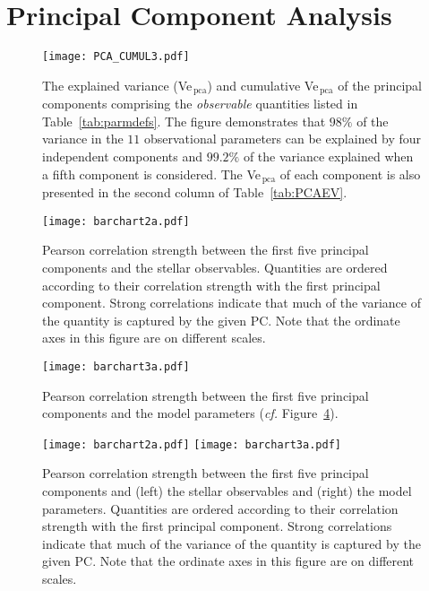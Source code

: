 \section{Principal Component Analysis}
\label{sec:PCA}
\begin{figure}
    \centering
    \texttt{[image: PCA\_CUMUL3.pdf]}
    \caption[Explained variance of principal components]{{The explained variance (Ve$_{\,\text{pca}}$) and cumulative Ve$_{\,\text{pca}}$ of the principal components comprising the \emph{observable} quantities listed in Table~\ref{tab:parmdefs}. The figure demonstrates that  $98\%$ of the variance in the $11$ observational parameters can be explained by four independent components and $99.2\%$ of the variance explained when a fifth component is considered. The Ve$_{\,\text{pca}}$ of each component is  also presented in the second column of Table~\ref{tab:PCAEV}. }}
    \label{fig:GCA-pca}
\end{figure}


\begin{figure} \centering
\texttt{[image: barchart2a.pdf]}%
\caption[Correlation between principal components and stellar observables]{ Pearson correlation strength between the first five principal components and the stellar observables.  Quantities are ordered according to their correlation strength with the first principal component.  Strong correlations indicate that much of the variance of the quantity is captured by the given PC. Note that the ordinate axes in this figure are on different scales. }
\label{fig:GCA-pcabar}
\end{figure}

\begin{figure} \centering
\texttt{[image: barchart3a.pdf]}%
\caption[Correlation between principal components and model parameters]{ Pearson correlation strength between the first five principal components and the model parameters (\emph{cf.} Figure~\ref{fig:GCA-pcabar}). }
\label{fig:GCA-pcabarb}
\end{figure}



\iffalse
\begin{figure} \centering
%
%
\texttt{[image: barchart2a.pdf]}%
\texttt{[image: barchart3a.pdf]}%
\caption{ Pearson correlation strength between the first five principal components and (left) the stellar observables and (right) the model parameters.  Quantities are ordered according to their correlation strength with the first principal component.  Strong correlations indicate that much of the variance of the quantity is captured by the given PC. Note that the ordinate axes in this figure are on different scales. }
\label{fig:GCA-pcabar}
\end{figure}


